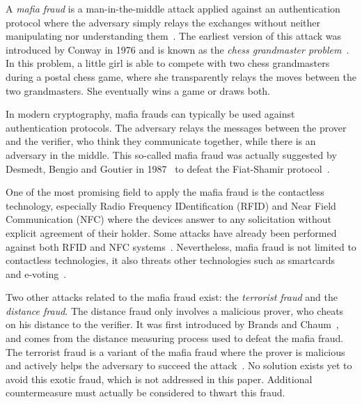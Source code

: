 \documentclass{llncs}
\begin{document}
A \emph{mafia fraud} is a man-in-the-middle attack applied against an authentication protocol where the adversary simply relays the exchanges without neither manipulating nor understanding them~\cite{AvoineBKLM-2011-jcs}. The earliest version of this attack was introduced by Conway in 1976 and is known as the \emph{chess grandmaster problem}~\cite{citeulike:1223195}. In this problem, a little girl is able to compete with two chess grandmasters during a postal chess game, where she transparently relays the moves between the two grandmasters. She eventually wins a game or draws both. 



In modern cryptography, mafia frauds can typically be used against authentication protocols. The adversary relays the messages between the prover and the verifier, who think they communicate together, while there is an adversary in the middle. This so-called mafia fraud was actually suggested by Desmedt, Bengio and Goutier in 1987~\cite{Desmedt:1987:SUS:646752.704723} to defeat the Fiat-Shamir protocol~\cite{FiatS-1986-crypto}. 


One of the most promising field to apply the mafia fraud is the contactless technology, especially Radio Frequency IDentification (RFID) and Near Field Communication (NFC) where the devices answer to any solicitation without explicit agreement of their holder. Some attacks have already been performed against both RFID and NFC systems~\cite{Francis:2010:PNP:1926325.1926331,Hancke:2008:ATD:1352533.1352566}. Nevertheless, mafia fraud is not limited to contactless technologies, it also threats other technologies such as smartcards~\cite{DrimerM-2007-usenix} and e-voting~\cite{OrenW-2009-eprint}.





Two other attacks related to the mafia fraud exist: the \emph{terrorist fraud} and the \emph{distance fraud}. The distance fraud only involves a malicious prover, who cheats on his distance to the verifier. It was first introduced by Brands and Chaum~\cite{Brands:1994:DP:188307.188361}, and comes from the distance measuring process used to defeat the mafia fraud. The terrorist fraud is a variant of the mafia fraud where the prover is malicious and actively helps the adversary to succeed the attack~\cite{BengioBDGQ-1991-crypto}. No solution exists yet to avoid this exotic fraud, which is not addressed in this paper. Additional countermeasure must actually be considered to thwart this fraud. 
\end{document}
